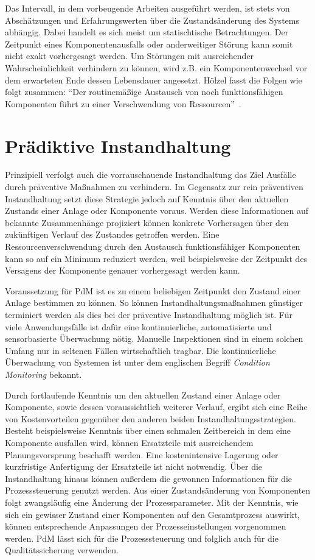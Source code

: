 Das Intervall, in dem vorbeugende Arbeiten ausgeführt werden, ist stets von Abschätzungen und Erfahrungswerten über die Zustandsänderung des Systems abhängig. Dabei handelt es sich meist um statischtische Betrachtungen. Der Zeitpunkt eines Komponentenausfalls oder anderweitiger Störung kann somit nicht exakt vorhergesagt werden. Um Störungen mit ausreichender Wahrscheinlichkeit verhindern zu können, wird z.B. ein Komponentenwechsel vor dem erwarteten Ende dessen Lebensdauer angesetzt. Hölzel fasst die Folgen wie folgt zusammen: \enquote{Der routinemäßige Austausch von noch funktionsfähigen Komponenten führt zu einer Verschwendung von Ressourcen}~\cite[S.~29]{Holzel.2019}.
\section{Prädiktive Instandhaltung}
\label{sec:praediktive_instandhaltung}
Prinzipiell verfolgt auch die vorrauschauende Instandhaltung das Ziel Ausfälle durch präventive Maßnahmen zu verhindern. Im Gegensatz zur rein präventiven Instandhaltung setzt diese Strategie jedoch auf Kenntnis über den aktuellen Zustands einer Anlage oder Komponente voraus. Werden diese Informationen auf bekannte Zusammenhänge projiziert können konkrete Vorhersagen über den zukünftigen Verlauf des Zustandes getroffen werden. Eine Ressourcenverschwendung durch den Austausch funktionsfähiger Komponenten kann so auf ein Minimum reduziert werden, weil beispielsweise der Zeitpunkt des Versagens der Komponente genauer vorhergesagt werden kann.

Voraussetzung für PdM ist es zu einem beliebigen Zeitpunkt den Zustand einer Anlage bestimmen zu können. So können Instandhaltungsmaßnahmen günstiger terminiert werden als dies bei der präventive Instandhaltung möglich ist. Für viele Anwendungsfälle ist dafür eine kontinuierliche, automatisierte und sensorbasierte Überwachung nötig. Manuelle Inspektionen sind in einem solchen Umfang nur in seltenen Fällen wirtschaftlich tragbar. Die kontinuierliche Überwachung von Systemen ist unter dem englischen Begriff \textit{Condition Monitoring} bekannt.

Durch fortlaufende Kenntnis um den aktuellen Zustand einer Anlage oder Komponente, sowie dessen voraussichtlich weiterer Verlauf, ergibt sich eine Reihe von Kostenvorteilen gegenüber den anderen beiden Instandhaltungsstrategien. Besteht beispielsweise Kenntnis über einen schmalen Zeitbereich in dem eine Komponente ausfallen wird, können Ersatzteile mit ausreichendem Planungsvorsprung beschafft werden. Eine kostenintensive Lagerung oder kurzfristige Anfertigung der Ersatzteile ist nicht notwendig. Über die Instandhaltung hinaus können außerdem die gewonnen Informationen für die Prozesssteuerung genutzt werden. Aus einer Zustandsänderung von Komponenten folgt zwangsläufig eine Änderung der Prozessparameter. Mit der Kenntnis, wie sich ein gewisser Zustand einer Komponenten auf den Gesamtprozess auswirkt, können entsprechende Anpassungen der Prozesseinstellungen vorgenommen werden. PdM lässt sich für die Prozesssteuerung und folglich auch für die Qualitätssicherung verwenden.

